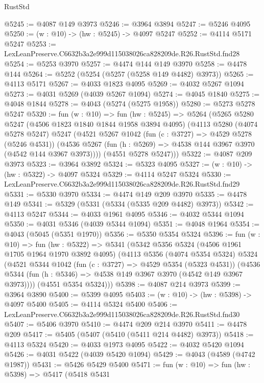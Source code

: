 \begin{lexlean}{RustStd}
\begin{coremodule}
@5245 := @4087 @149 @3973
@5246 := @3964 @3894
@5247 := @5246 @4095
@5250 := (w : @10) -> (hw : @5245) -> @4097 @5247
@5252 := @4114 @5171 @5247
@5253 := LexLeanPreserve.C6632b3a2e999d115038026ca828209de.R26.RustStd.fnd28
@5254 := @5253 @3970
@5257 := @4474 @144 @149 @3970
@5258 := @4478 @144
@5264 := @5252 (@5254 (@5257 (@5258 @149 @4482) @3973))
@5265 := @4113 @5171
@5267 := @4033 @1823 @4095
@5269 := @4032 @5267 @1094
@5273 := @4031 @5269 (@4039 @5267 @1094)
@5274 := @4045 @1840
@5275 := @4048 @1844
@5278 := @4043 (@5274 (@5275 @1958))
@5280 := @5273 @5278 @5247
@5320 := fun (w : @10) =>
  fun (hw : @5245) =>
  @5264
    (@5265
      @5280
      @5247
      (@4506 @1823 @1840 @1844 @1958 @3894 @4095)
      (@4113
        @5280
        (@4074 @5278 @5247)
        @5247
        (@4521
          @5267
          @1042
          (fun (c : @3727) => @4529 @5278 (@5246 @4531))
          (@4536 @5267 (fun (h : @5269) => @4538 @144 @3967 @3970 (@4542 @144 @3967 @3973))))
        (@4551 @5278 @5247)))
@5322 := @4087 @209 @3973
@5323 := @3964 @3892
@5324 := @5323 @4095
@5327 := (w : @10) -> (hw : @5322) -> @4097 @5324
@5329 := @4114 @5247 @5324
@5330 := LexLeanPreserve.C6632b3a2e999d115038026ca828209de.R26.RustStd.fnd29
@5331 := @5330 @3970
@5334 := @4474 @149 @209 @3970
@5335 := @4478 @149
@5341 := @5329 (@5331 (@5334 (@5335 @209 @4482) @3973))
@5342 := @4113 @5247
@5344 := @4033 @1961 @4095
@5346 := @4032 @5344 @1094
@5350 := @4031 @5346 (@4039 @5344 @1094)
@5351 := @4048 @1964
@5354 := @4043 (@5045 (@5351 @1970))
@5356 := @5350 @5354 @5324
@5396 := fun (w : @10) =>
  fun (hw : @5322) =>
  @5341
    (@5342
      @5356
      @5324
      (@4506 @1961 @1705 @1964 @1970 @3892 @4095)
      (@4113
        @5356
        (@4074 @5354 @5324)
        @5324
        (@4521
          @5344
          @1042
          (fun (c : @3727) => @4529 @5354 (@5323 @4531))
          (@4536 @5344 (fun (h : @5346) => @4538 @149 @3967 @3970 (@4542 @149 @3967 @3973))))
        (@4551 @5354 @5324)))
@5398 := @4087 @214 @3973
@5399 := @3964 @3890
@5400 := @5399 @4095
@5403 := (w : @10) -> (hw : @5398) -> @4097 @5400
@5405 := @4114 @5324 @5400
@5406 := LexLeanPreserve.C6632b3a2e999d115038026ca828209de.R26.RustStd.fnd30
@5407 := @5406 @3970
@5410 := @4474 @209 @214 @3970
@5411 := @4478 @209
@5417 := @5405 (@5407 (@5410 (@5411 @214 @4482) @3973))
@5418 := @4113 @5324
@5420 := @4033 @1973 @4095
@5422 := @4032 @5420 @1094
@5426 := @4031 @5422 (@4039 @5420 @1094)
@5429 := @4043 (@4589 (@4742 @1987))
@5431 := @5426 @5429 @5400
@5471 := fun (w : @10) =>
  fun (hw : @5398) =>
  @5417
    (@5418
      @5431

\end{coremodule}
\end{lexlean}
